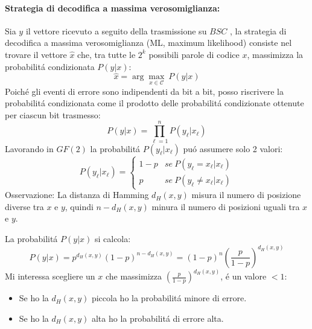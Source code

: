             \paragraph{Strategia di decodifica a massima verosomiglianza:}
                Sia $y$ il vettore ricevuto a seguito della trasmissione su $BSC$ , la strategia di decodifica a massima verosomiglianza (ML, maximum likelihood) 
                consiste nel trovare il vettore $\hat{x}$ che, tra tutte le $2^k$ possibili parole di codice $x$, massimizza la probabilitá condizionata 
                $P(y|x)$:
                \[
                    \hat{x} = \arg \underset{x\in\mathcal{C}}{\max}\ P(y|x)
                \]
                Poiché gli eventi di errore sono indipendenti da bit a bit, posso riscrivere la probabilitá condizionata come il prodotto delle probabilitá condizionate
                ottenute per ciascun bit trasmesso:
                \[
                    P(y|x) = \prod_{\ell=1}^{n} P(y_\ell|x_\ell)
                \]
                Lavorando in $GF(2)$ la probabilitá $P(y_\ell|x_\ell)$ puó assumere solo 2 valori:
                \[
                    P(y_\ell|x_\ell) = 
                    \begin{cases}
                        1-p &se\ P(y_\ell =x_\ell|x_\ell)\nonumber \\    
                        p   &se\ P(y_\ell \neq x_\ell|x_\ell)\nonumber     
                    \end{cases}
                \] 
                Osservazione: La distanza di Hamming $d_H(x,y)$ misura il numero di posizione diverse tra $x$ e $y$, quindi $n-d_H(x,y)$ minura il numero di posizioni
                uguali tra $x$ e $y$.

                La probabilitá $P(y|x)$ si calcola:
                \[
                    P(y|x) = p^{d_H(x,y)}(1-p)^{n-d_H(x,y)} =(1-p)^{n}\left(\frac{p}{1-p}\right)^{d_H(x,y)} 
                \]
                Mi interessa scegliere un $x$ che massimizza $\left(\frac{p}{1-p}\right)^{d_H(x,y)}$, é un valore $<1$:
                \begin{itemize}
                    \item {
                        Se ho la $d_H(x,y)$ piccola ho la probabilitá minore di errore.
                    }
                    \item {
                        Se ho la $d_H(x,y)$ alta ho la probabilitá di errore alta.
                    }
                \end{itemize}
                
